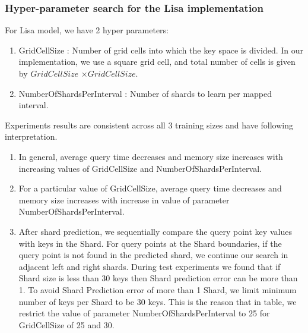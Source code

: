 \subsubsection {Hyper-parameter search for the Lisa implementation}
For Lisa model, we have 2 hyper parameters:
\begin{enumerate}
	\item GridCellSize : Number of grid cells into which the key space is divided. In our implementation, we use a square grid cell, and total number of cells is given by $GridCellSize$ $\times GridCellSize$.
	\item NumberOfShardsPerInterval : Number of shards to learn per mapped interval. 
\end{enumerate}

Experiments results are consistent across all 3 training sizes and have following interpretation. 
\begin{enumerate}
    \item In general, average query time decreases and memory size increases with increasing values of GridCellSize and NumberOfShardsPerInterval.
	\item For a particular value of GridCellSize, average query time decreases and memory size increases with increase in value of parameter NumberOfShardsPerInterval.
	\item After shard prediction, we sequentially compare the query point key values with keys in the Shard. For query points at the Shard boundaries, if the query point is not found in the predicted shard, we continue our search in adjacent left and right shards. During test experiments we found that if Shard size is less than 30 keys then Shard prediction error can be more than 1. To avoid Shard Prediction error of more than 1 Shard, we limit minimum number of keys per Shard to be 30 keys. This is the reason that in table, we restrict the value of parameter NumberOfShardsPerInterval to 25 for GridCellSize of 25 and 30.   

\end{enumerate}

